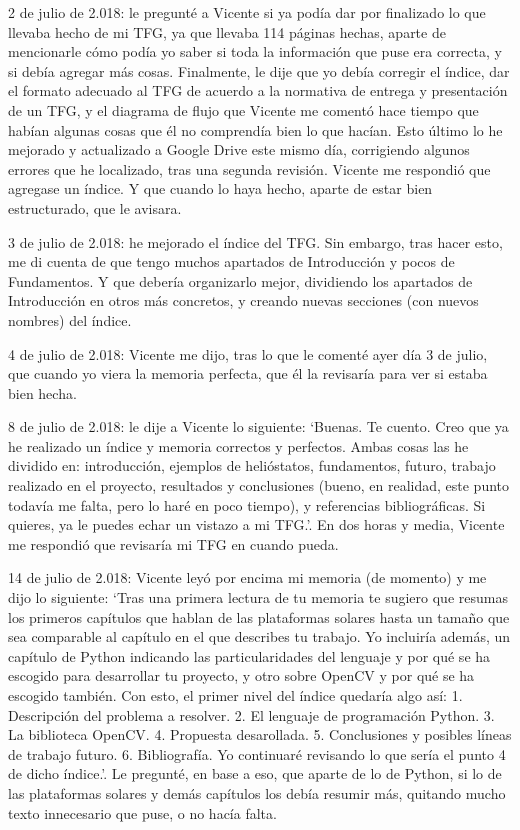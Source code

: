 \documentclass[12pt]{article}
\begin{document}
2 de julio de 2.018: le pregunté a Vicente si ya podía dar por finalizado lo que llevaba hecho de mi TFG, ya que llevaba 114 páginas hechas, aparte de mencionarle cómo podía yo saber si toda la información que puse era correcta, y si debía agregar más cosas. Finalmente, le dije que yo debía corregir el índice, dar el formato adecuado al TFG de acuerdo a la normativa de entrega y presentación de un TFG, y el diagrama de flujo que Vicente me comentó hace tiempo que habían algunas cosas que él no comprendía bien lo que hacían. Esto último lo he mejorado y actualizado a Google Drive este mismo día, corrigiendo algunos errores que he localizado, tras una segunda revisión. Vicente me respondió que agregase un índice. Y que cuando lo haya hecho, aparte de estar bien estructurado, que le avisara.

3 de julio de 2.018: he mejorado el índice del TFG. Sin embargo, tras hacer esto, me di cuenta de que tengo muchos apartados de Introducción y pocos de Fundamentos. Y que debería organizarlo mejor, dividiendo los apartados de Introducción en otros más concretos, y creando nuevas secciones (con nuevos nombres) del índice.

4 de julio de 2.018: Vicente me dijo, tras lo que le comenté ayer día 3 de julio, que cuando yo viera la memoria perfecta, que él la revisaría para ver si estaba bien hecha.

8 de julio de 2.018: le dije a Vicente lo siguiente: ‘Buenas. Te cuento. Creo que ya he realizado un índice y memoria correctos y perfectos. Ambas cosas las he dividido en: introducción, ejemplos de helióstatos, fundamentos, futuro, trabajo realizado en el proyecto, resultados y conclusiones (bueno, en realidad, este punto todavía me falta, pero lo haré en poco tiempo), y referencias bibliográficas. Si quieres, ya le puedes echar un vistazo a mi TFG.’. En dos horas y media, Vicente me respondió que revisaría mi TFG en cuando pueda.

14 de julio de 2.018: Vicente leyó por encima mi memoria (de momento) y me dijo lo siguiente: ‘Tras una primera lectura de tu memoria te sugiero que resumas los primeros capítulos que hablan de las plataformas solares hasta un tamaño que sea comparable al capítulo en el que describes tu trabajo. Yo incluiría además, un capítulo de Python indicando las particularidades del lenguaje y por qué se ha escogido para desarrollar tu proyecto, y otro sobre OpenCV y por qué se ha escogido también. Con esto, el primer nivel del índice quedaría algo así:
1. Descripción del problema a resolver.
2. El lenguaje de programación Python.
3. La biblioteca OpenCV.
4. Propuesta desarollada.
5. Conclusiones y posibles líneas de trabajo futuro.
6. Bibliografía.
Yo continuaré revisando lo que sería el punto 4 de dicho índice.’. Le pregunté, en base a eso, que aparte de lo de Python, si lo de las plataformas solares y demás capítulos los debía resumir más, quitando mucho texto innecesario que puse, o no hacía falta.
\end{document}
